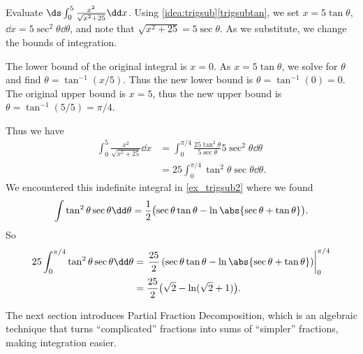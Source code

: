 \begin{example}\label{ex_trigsub6}
Evaluate $\ds\int_0^5\frac{x^2}{\sqrt{x^2+25}}\dd x$.
\solution
Using \autoref{idea:trigsub}\ref*{trigsubtan}, we set $x=5\tan\theta$, $\dd x = 5\sec^2\theta\dd\theta$, and note that $\sqrt{x^2+25} = 5\sec\theta$. As we substitute, we change the bounds of integration.

The lower bound of the original integral is $x=0$. As $x=5\tan\theta$, we solve for $\theta$ and find $\theta = \tan^{-1}(x/5)$. Thus the new lower bound is $\theta = \tan^{-1}(0) = 0$. The original upper bound is $x=5$, thus the new upper bound is $\theta = \tan^{-1}(5/5) = \pi/4$. 

Thus we have 
\begin{align*}
\int_0^5\frac{x^2}{\sqrt{x^2+25}}\dd x &= \int_0^{\pi/4} \frac{25\tan^2\theta}{5\sec\theta}5\sec^2\theta\dd\theta\\
		&= 25\int_0^{\pi/4} \tan^2\theta\sec\theta\dd\theta.
\end{align*}
We encountered this indefinite integral in \autoref{ex_trigsub2} where we found 
\[\int \tan^2\theta\sec\theta \dd\theta = \frac12\bigl(\sec\theta\tan\theta-\ln\abs{\sec\theta+\tan\theta}\bigr).\]
So
\begin{align*}
	25\int_0^{\pi/4} \tan^2\theta\sec\theta\dd\theta
	&= \left.\frac{25}2\left(\sec\theta\tan\theta-\ln\abs{\sec\theta+\tan\theta}\right)\right|_0^{\pi/4}\\
	&= \frac{25}2\bigl(\sqrt2-\ln(\sqrt2+1)\bigr)
	.
\end{align*}
\end{example}

%

The next section introduces Partial Fraction Decomposition, which is an algebraic technique that turns ``complicated'' fractions into sums of ``simpler'' fractions, making integration easier.

